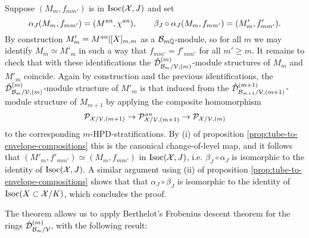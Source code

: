\documentclass{article}
\theoremstyle{change}
\numberwithin{equation}{subsubsection}
\newcommand{\demobox}{\vrule height6pt width6pt depth0pt}
\newenvironment{demo}{\noindent{\it Proof.}}
{{\unskip\nobreak\hfil\qquad
\demobox\parfillskip=0pt\par}
\medskip}
\begin{document}
\begin{demo}
  Suppose $(M_m,f_{mm'})$ is in $\mathrm{Isoc}({\cal X},J)$ and set
  \begin{displaymath}
    \alpha_J(M_m,f_{mm'})=(M^{\mathit{an}},\chi^{\mathit{an}}),
    \qquad
    \beta_J\circ\alpha_J(M_m,f_{mm'})=(M'_m,f'_{mm'}).
  \end{displaymath}
  By construction $M'_m=M^{\mathit{an}}|[X]_{m,m}$ as a ${\cal B}_{m{\mathbb Q}}$-module, so
  for all $m$ we may identify $M_m\simeq M'_m$ in such a way that
  $f_{mm'}=f'_{mm'}$ for all $m'\ge m$. It remains to check that with
  these identifications the ${\hat{\cal D}}^{({m})}_{{\cal B}_m/{\cal V},(m)}$-module
  structures of $M_m$ and $M'_m$ coincide. Again by construction and
  the previous identifications, the
  ${\hat{\cal D}}^{({m})}_{{\cal B}_m/{\cal V},(m)}$-module structure of $M'_m$ is that
  induced from the ${\hat{\cal D}}^{({m+1})}_{{\cal B}_{m+1}/{\cal V},(m+1)}$-module
  structure of $M_{m+1}$ by applying the composite homomorphism
  \begin{displaymath}
    {\cal P}_{{\cal X}/{\cal V},(m+1)}\to{\cal P}^{\mathit{an}}_{{\cal X}/{\cal V},(m+1)}\to{\cal P}_{{\cal X}/{\cal V},(m)}
  \end{displaymath}
  to the corresponding $m$-HPD-stratifications.  By (i) of proposition
  \ref{prop:tube-to-envelope-compositions} this is the canonical
  change-of-level map, and it follows that
  $(M'_m,f'_{mm'})\simeq(M_m,f_{mm'})$ in $\mathrm{Isoc}({\cal X},J)$, i.e.
  $\beta_J\circ\alpha_J$ is isomorphic to the identity of
  $\mathrm{Isoc}({\cal X},J)$. A similar argument using (ii) of proposition
  \ref{prop:tube-to-envelope-compositions} shows that that
  $\alpha_J\circ\beta_J$ is isomorphic to the identity of
  $\mathrm{Isoc}(X\subset{\cal X}/K)$, which concludes the proof.
\end{demo}

The theorem allows us to apply Berthelot's Frobenius descent theorem
for the rings ${\hat{\cal D}}^{({m})}_{{\cal B}_m/{\cal V}}$, with the following result: 
\end{document}
